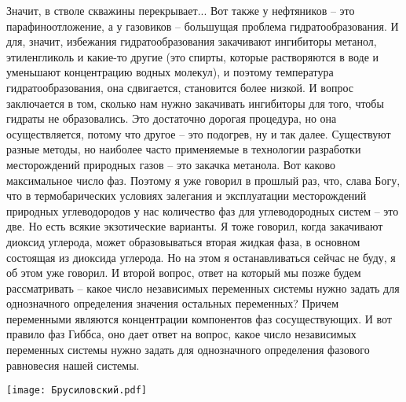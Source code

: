 \documentclass[main.tex]{subfiles}
\begin{document}
Значит, в стволе скважины перекрывает...
Вот также у нефтяников -- это парафиноотложение, а у газовиков -- большущая проблема гидратообразования.
И для, значит, избежания гидратообразования закачивают ингибиторы метанол, этиленгликоль и какие-то другие (это спирты, которые растворяются в воде и уменьшают концентрацию водных молекул), и поэтому температура гидратообразования, она сдвигается, становится более низкой.
И вопрос заключается в том, сколько нам нужно закачивать ингибиторы для того, чтобы гидраты не образовались.
Это достаточно дорогая процедура, но она осуществляется, потому что другое -- это подогрев, ну и так далее.
Существуют разные методы, но наиболее часто применяемые в технологии разработки месторождений природных газов -- это закачка метанола.
Вот каково максимальное число фаз.
Поэтому я уже говорил в прошлый раз, что, слава Богу, что в термобарических условиях залегания и эксплуатации месторождений природных углеводородов у нас количество фаз для углеводородных систем -- это две.
Но есть всякие экзотические варианты.
Я тоже говорил, когда закачивают диоксид углерода, может образовываться вторая жидкая фаза, в основном состоящая из диоксида углерода.
Но на этом я останавливаться сейчас не буду, я об этом уже говорил.
И второй вопрос, ответ на который мы позже будем рассматривать -- какое число независимых переменных системы нужно задать для однозначного определения значения остальных переменных?
Причем переменными являются концентрации компонентов фаз сосуществующих.
И вот правило фаз Гиббса, оно дает ответ на вопрос, какое число независимых переменных системы нужно задать для однозначного определения фазового равновесия нашей системы.

\begin{center}
\texttt{[image: Брусиловский.pdf]}
\end{center}
\end{document}
